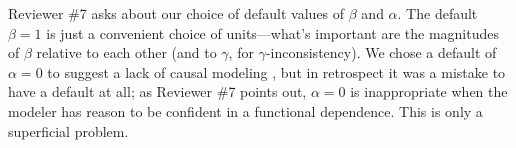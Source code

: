\documentclass{article}
\makeatletter
\theoremstyle{plain}
\theoremstyle{definition}
\newcommand{\balpha}{\boldsymbol\alpha}
\newcommand{\dg}[1]{\mathbdcal{#1}}
\newcommand\aar{\@ifstar\aar@one@star\aar@plain}
\newcommand\aar@one@star{\@ifstar\aar@resize{\aar@plain*}}
\newcommand\aar@resize[1]{\sbox{\aar@content}{#1}\scaleleftright[3.8ex]
			{\Biggl\langle\!\!\!\!\Biggl\langle}{\usebox{\aar@content}}
			{\Biggr\rangle\!\!\!\!\Biggr\rangle}}
\makeatother
\begin{document}
Reviewer \#7 asks about our choice of default values of $\beta$ and $\alpha$.
The default $\beta\!=\! 1$ is just a convenient choice of units---what’s important are the magnitudes of $\beta$ relative to each other (and to $\gamma$, for $\gamma$-inconsistency).
%
We chose a default of $\alpha\!=\! 0$ to suggest a lack of causal modeling%
, but in retrospect it was a mistake to have a default at all; %
as Reviewer \#7 points out, $\alpha\!=\! 0$ is inappropriate when the modeler has reason to be confident in a functional dependence.
%
This is only a superficial problem.
\end{document}
